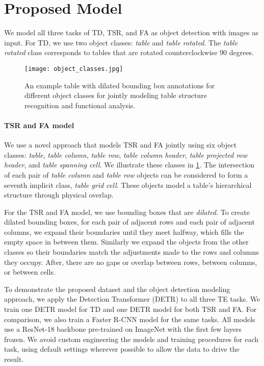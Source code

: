 \documentclass[10pt,twocolumn,letterpaper]{article}
\begin{document}
\section{Proposed Model}\label{sec:model}

We model all three tasks of TD, TSR, and FA as object detection with images as input.
For TD, we use two object classes: \textit{table} and \textit{table rotated}.
The \textit{table rotated} class corresponds to tables that are rotated counterclockwise 90 degrees.

\begin{figure}[]
  \centering
  \texttt{[image: object\_classes.jpg]}
  \caption{An example table with dilated bounding box annotations for different object classes for jointly modeling table structure recognition and functional analysis.}
  \label{fig:object_classes}
\end{figure}

\paragraph{TSR and FA model} We use a novel approach that models TSR and FA jointly using six object classes: \textit{table}, \textit{table column}, \textit{table row}, \textit{table column header}, \textit{table projected row header}, and \textit{table spanning cell}.
We illustrate these classes in \cref{fig:object_classes}.
The intersection of each pair of \textit{table column} and \textit{table row} objects can be considered to form a seventh implicit class, \textit{table grid cell}.
These objects model a table's hierarchical structure through physical overlap.

For the TSR and FA model, we use bounding boxes that are \textit{dilated}.
To create dilated bounding boxes, for each pair of adjacent rows and each pair of adjacent columns, we expand their boundaries until they meet halfway, which fills the empty space in between them.
Similarly we expand the objects from the other classes so their boundaries match the adjustments made to the rows and columns they occupy.
After, there are no gaps or overlap between rows, between columns, or between cells.

To demonstrate the proposed dataset and the object detection modeling approach, we apply the Detection Transformer (DETR) \cite{carion2020end} to all three TE tasks.
We train one DETR model for TD and one DETR model for both TSR and FA.
For comparison, we also train a Faster R-CNN \cite{ren2015faster} model for the same tasks.
All models use a ResNet-18 backbone pre-trained on ImageNet with the first few layers frozen.
We avoid custom engineering the models and training procedures for each task, using default settings wherever possible to allow the data to drive the result.
\end{document}
